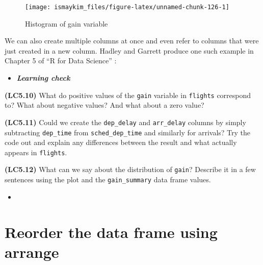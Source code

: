 \documentclass[12pt,]{krantz}
\makeatletter
\newenvironment{Shaded}{\begin{snugshade}}{\end{snugshade}}
\newcommand{\KeywordTok}[1]{\textcolor[rgb]{0.27,0.27,0.27}{\textbf{#1}}}
\newcommand{\DataTypeTok}[1]{\textcolor[rgb]{0.27,0.27,0.27}{#1}}
\newcommand{\DecValTok}[1]{\textcolor[rgb]{0.06,0.06,0.06}{#1}}
\newcommand{\StringTok}[1]{\textcolor[rgb]{0.5,0.5,0.5}{#1}}
\newcommand{\OperatorTok}[1]{\textcolor[rgb]{0.43,0.43,0.43}{\textbf{#1}}}
\newcommand{\NormalTok}[1]{#1}
\newenvironment{kframe}{%
\medskip{}
\setlength{\fboxsep}{.8em}
 \def\at@end@of@kframe{}%
 \ifinner\ifhmode%
  \def\at@end@of@kframe{\end{minipage}}%
  \begin{minipage}{\columnwidth}%
 \fi\fi%
 \def\FrameCommand##1{\hskip\@totalleftmargin \hskip-\fboxsep
 \colorbox{shadecolor}{##1}\hskip-\fboxsep
     \hskip-\linewidth \hskip-\@totalleftmargin \hskip\columnwidth}%
 \MakeFramed {\advance\hsize-\width
   \@totalleftmargin\z@ \linewidth\hsize
   \@setminipage}}%
 {\par\unskip\endMakeFramed%
 \at@end@of@kframe}
\renewenvironment{Shaded}{\begin{kframe}}{\end{kframe}}
\newenvironment{rmdblock}[1]
  {\begin{shaded*}
  \begin{itemize}
  \renewcommand{\labelitemi}{
    \raisebox{-.7\height}[0pt][0pt]{
    }
  }
  \item
  }
  {
  \end{itemize}
  \end{shaded*}
  }
\newenvironment{learncheck}
  {\begin{rmdblock}{warning}}
  {\end{rmdblock}}
\makeatother
\begin{document}
\begin{figure}

{\centering \texttt{[image: ismaykim\_files/figure-latex/unnamed-chunk-126-1]} 

}

\caption{Histogram of gain variable}\label{fig:unnamed-chunk-126}
\end{figure}

We can also create multiple columns at once and even refer to columns
that were just created in a new column. Hadley and Garrett produce one
such example in Chapter 5 of ``R for Data Science'' \citep{rds2016}:

\begin{Shaded}
\end{Shaded}

\begin{learncheck}
\textbf{\emph{Learning check}}
\end{learncheck}

\textbf{(LC5.10)} What do positive values of the \texttt{gain} variable
in \texttt{flights} correspond to? What about negative values? And what
about a zero value?

\textbf{(LC5.11)} Could we create the \texttt{dep\_delay} and
\texttt{arr\_delay} columns by simply subtracting \texttt{dep\_time}
from \texttt{sched\_dep\_time} and similarly for arrivals? Try the code
out and explain any differences between the result and what actually
appears in \texttt{flights}.

\textbf{(LC5.12)} What can we say about the distribution of
\texttt{gain}? Describe it in a few sentences using the plot and the
\texttt{gain\_summary} data frame values.

\begin{learncheck}

\end{learncheck}

\section{Reorder the data frame using arrange}\label{arrange}
\end{document}
